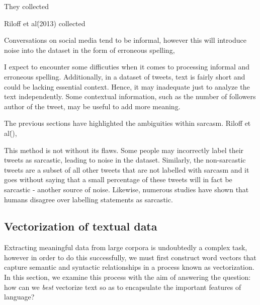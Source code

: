 \documentclass[12pt,a4paper]{article}
\begin{document}
They collected 



Riloff et al\. (2013) \cite{riloff2013sarcasm} collected 



Conversations on social media tend to be informal, however this will introduce noise into the dataset in the form of erroneous spelling, 

I expect to encounter some difficuties when it comes to processing informal and erroneous spelling. Additionally, in a dataset of tweets, text is fairly short and could be lacking essential context. Hence, it may inadequate just to analyze the text independently. Some contextual information, such as the number of followers author of the tweet, may be useful to add more meaning.

\noindent The previous sections have highlighted the ambiguities within sarcasm. 
Riloff et al\. (), 


This method is not without its flaws. Some people may incorrectly label their tweets as sarcastic, leading to noise in the dataset. Similarly, the non-sarcastic tweets are a subset of all other tweets that are not labelled with sarcasm and it goes without saying that a small percentage of these tweets will in fact be sarcastic - another source of noise.
Likewise, numerous studies have shown that humans disagree over labelling statements as sarcastic.

\vfill

\subsection{Vectorization of textual data}
\noindent Extracting meaningful data from large corpora is undoubtedly a complex task, however in order to do this successfully, we must first construct word vectors that capture semantic and syntactic relationships in a process known as vectorization. In this section, we examine this process with the aim of answering the question: how can we \textit{best} vectorize text so as to encapsulate the important features of language?
\end{document}
